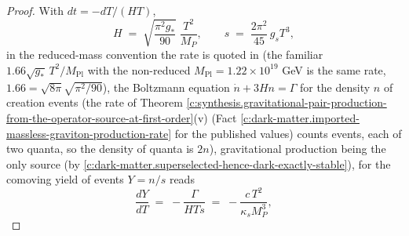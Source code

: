 \documentclass[11pt]{article}
\theoremstyle{definition}
\theoremstyle{plain}
\begin{document}
\begin{proof}
With $dt = -dT/(HT)$,
\[
H \;=\; \sqrt{\frac{\pi^{2}g_{*}}{90}}\;\frac{T^{2}}{M_{P}}, \qquad s \;=\; \frac{2\pi^{2}}{45}\,g_{s}T^{3},
\]
in the reduced-mass convention the rate is quoted in (the familiar $1.66\sqrt{g_{*}}\,T^{2}/M_{\mathrm{Pl}}$ with the non-reduced $M_{\mathrm{Pl}} = 1.22 \times 10^{19}$ GeV is the same rate, $1.66 = \sqrt{8\pi}\sqrt{\pi^{2}/90}$), the Boltzmann equation $\dot{n} + 3Hn = \Gamma$ for the density $n$ of creation events (the rate of Theorem \ref{c:synthesis.gravitational-pair-production-from-the-operator-source-at-first-order}(v) (Fact \ref{c:dark-matter.imported-massless-graviton-production-rate} for the published values) counts events, each of two quanta, so the density of quanta is $2n$), gravitational production being the only source (by \ref{c:dark-matter.superselected-hence-dark-exactly-stable}), for the comoving yield of events $Y = n/s$ reads
\[
\frac{dY}{dT} \;=\; -\frac{\Gamma}{HTs} \;=\; -\frac{c\,T^{2}}{\kappa_{s}M_{P}^{3}},
\]

\end{proof}
\end{document}
